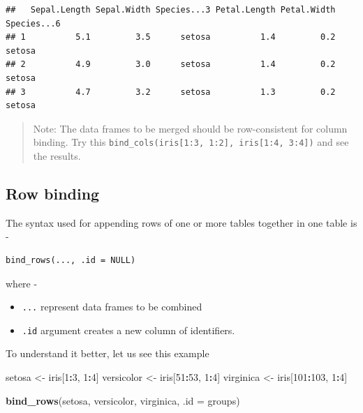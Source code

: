 \documentclass[
]{book}
\newenvironment{Shaded}{\begin{snugshade}}{\end{snugshade}}
\newcommand{\AttributeTok}[1]{\textcolor[rgb]{0.13,0.29,0.53}{#1}}
\newcommand{\DecValTok}[1]{\textcolor[rgb]{0.00,0.00,0.81}{#1}}
\newcommand{\FunctionTok}[1]{\textcolor[rgb]{0.13,0.29,0.53}{\textbf{#1}}}
\newcommand{\NormalTok}[1]{#1}
\newcommand{\OtherTok}[1]{\textcolor[rgb]{0.56,0.35,0.01}{#1}}
\newcommand{\SpecialCharTok}[1]{\textcolor[rgb]{0.81,0.36,0.00}{\textbf{#1}}}
\newcommand{\StringTok}[1]{\textcolor[rgb]{0.31,0.60,0.02}{#1}}
\providecommand{\tightlist}{%
  \setlength{\itemsep}{0pt}\setlength{\parskip}{0pt}}
\begin{document}
\begin{verbatim}
##   Sepal.Length Sepal.Width Species...3 Petal.Length Petal.Width Species...6
## 1          5.1         3.5      setosa          1.4         0.2      setosa
## 2          4.9         3.0      setosa          1.4         0.2      setosa
## 3          4.7         3.2      setosa          1.3         0.2      setosa
\end{verbatim}

\begin{quote}
Note: The data frames to be merged should be row-consistent for column binding. Try this \texttt{bind\_cols(iris{[}1:3,\ 1:2{]},\ iris{[}1:4,\ 3:4{]})} and see the results.
\end{quote}

\hypertarget{row-binding}{%
\subsection{Row binding}\label{row-binding}}

The syntax used for appending rows of one or more tables together in one table is -

\begin{verbatim}
bind_rows(..., .id = NULL)
\end{verbatim}

where -

\begin{itemize}
\tightlist
\item
  \texttt{...} represent data frames to be combined
\item
  \texttt{.id} argument creates a new column of identifiers.
\end{itemize}

To understand it better, let us see this example

\begin{Shaded}
\begin{Highlighting}[]
\NormalTok{setosa }\OtherTok{\textless{}{-}}\NormalTok{ iris[}\DecValTok{1}\SpecialCharTok{:}\DecValTok{3}\NormalTok{, }\DecValTok{1}\SpecialCharTok{:}\DecValTok{4}\NormalTok{]}
\NormalTok{versicolor }\OtherTok{\textless{}{-}}\NormalTok{ iris[}\DecValTok{51}\SpecialCharTok{:}\DecValTok{53}\NormalTok{, }\DecValTok{1}\SpecialCharTok{:}\DecValTok{4}\NormalTok{]}
\NormalTok{virginica }\OtherTok{\textless{}{-}}\NormalTok{ iris[}\DecValTok{101}\SpecialCharTok{:}\DecValTok{103}\NormalTok{, }\DecValTok{1}\SpecialCharTok{:}\DecValTok{4}\NormalTok{]}

\FunctionTok{bind\_rows}\NormalTok{(setosa, versicolor, virginica, }\AttributeTok{.id =} \StringTok{\textquotesingle{}groups\textquotesingle{}}\NormalTok{)}
\end{Highlighting}
\end{Shaded}
\end{document}
